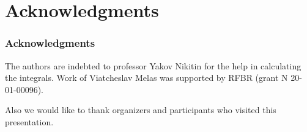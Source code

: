 \documentclass[slidestop,usepdftitle=false]{beamer}
\begin{document}
\section{Acknowledgments}
\begin{slide}
\frametitle{Acknowledgments}
\bigskip
\bigskip
The authors are indebted to professor
 Yakov Nikitin for the help in calculating the  integrals. Work of Viatcheslav Melas was supported by RFBR (grant N 20-01-00096).
 \bigskip

 Also we would like to thank organizers and participants who visited this presentation.
\end{slide}
\end{document}
